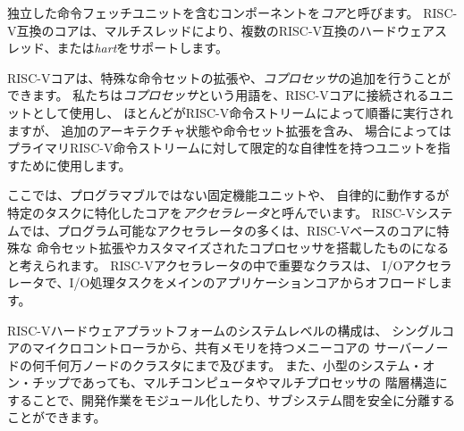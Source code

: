 独立した命令フェッチユニットを含むコンポーネントを{\em コア}と呼びます。
RISC-V互換のコアは、マルチスレッドにより、複数のRISC-V互換のハードウェアスレッド、または{\em hart}をサポートします。

RISC-Vコアは、特殊な命令セットの拡張や、{\em コプロセッサ}の追加を行うことができます。
私たちは{\em コプロセッサ}という用語を、RISC-Vコアに接続されるユニットとして使用し、
ほとんどがRISC-V命令ストリームによって順番に実行されますが、
追加のアーキテクチャ状態や命令セット拡張を含み、
場合によってはプライマリRISC-V命令ストリームに対して限定的な自律性を持つユニットを指すために使用します。

ここでは、プログラマブルではない固定機能ユニットや、
自律的に動作するが特定のタスクに特化したコアを{\em アクセラレータ}と呼んでいます。 
RISC-Vシステムでは、プログラム可能なアクセラレータの多くは、RISC-Vベースのコアに特殊な
命令セット拡張やカスタマイズされたコプロセッサを搭載したものになると考えられます。
RISC-Vアクセラレータの中で重要なクラスは、
I/Oアクセラレータで、I/O処理タスクをメインのアプリケーションコアからオフロードします。

RISC-Vハードウェアプラットフォームのシステムレベルの構成は、
シングルコアのマイクロコントローラから、共有メモリを持つメニーコアの
サーバーノードの何千何万ノードのクラスタにまで及びます。 
また、小型のシステム・オン・チップであっても、マルチコンピュータやマルチプロセッサの
階層構造にすることで、開発作業をモジュール化したり、サブシステム間を安全に分離することができます。

